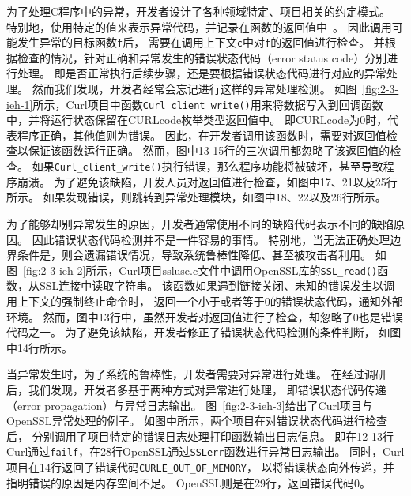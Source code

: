 

为了处理C程序中的异常，开发者设计了各种领域特定、项目相关的约定模式。
特别地，使用特定的值来表示异常代码，并记录在函数的返回值中~\cite{08-fast-eio}。
因此调用可能发生异常的目标函数\texttt{f}后，
需要在调用上下文\texttt{c}中对\texttt{f}的返回值进行检查。
并根据检查的情况，针对正确和异常发生的错误状态代码（error status code）分别进行处理。
即是否正常执行后续步骤，还是要根据错误状态代码进行对应的异常处理。
然而我们发现，开发者经常会忘记进行这样的异常处理检测。
如图~\ref{fig:2-3-ieh-1}所示，Curl项目中函数\texttt{Curl\_client\_write()}用来将数据写入到回调函数中，并将运行状态保留在CURLcode枚举类型返回值中。
即CURLcode为0时，代表程序正确，其他值则为错误。
因此，在开发者调用该函数时，需要对返回值检查以保证该函数运行正确。
然而，图中13-15行的三次调用都忽略了该返回值的检查。
如果\texttt{Curl\_client\_write()}执行错误，那么程序功能将被破坏，甚至导致程序崩溃。
为了避免该缺陷，开发人员对返回值进行检查，如图中17、21以及25行所示。
如果发现错误，则跳转到异常处理模块，如图中18、22以及26行所示。



为了能够却别异常发生的原因，开发者通常使用不同的缺陷代码表示不同的缺陷原因。
因此错误状态代码检测并不是一件容易的事情。
特别地，当无法正确处理边界条件是，则会遗漏错误情况，导致系统鲁棒性降低、甚至被攻击者利用。
如图~\ref{fig:2-3-ieh-2}所示，Curl项目ssluse.c文件中调用OpenSSL库的\texttt{SSL\_read()}函数，从SSL连接中读取字符串。
该函数如果遇到链接关闭、未知的错误发生以调用上下文的强制终止命令时，
返回一个小于或者等于0的错误状态代码，通知外部环境。
然而，图中13行中，虽然开发者对返回值进行了检查，却忽略了0也是错误代码之一。
为了避免该缺陷，开发者修正了错误状态代码检测的条件判断，
如图中14行所示。



当异常发生时，为了系统的鲁棒性，开发者需要对异常进行处理。
在经过调研后，我们发现，开发者多基于两种方式对异常进行处理，
即错误状态代码传递（error propagation）与异常日志输出。
图~\ref{fig:2-3-ieh-3}给出了Curl项目与OpenSSL异常处理的例子。
如图中所示，两个项目在对错误状态代码进行检查后，
分别调用了项目特定的错误日志处理打印函数输出日志信息。
即在12-13行Curl通过\texttt{failf}，在28行OpenSSL通过\texttt{SSLerr}函数进行异常日志输出。
同时，Curl项目在14行返回了错误代码\texttt{CURLE\_OUT\_OF\_MEMORY}，
以将错误状态向外传递，并指明错误的原因是内存空间不足。
OpenSSL则是在29行，返回错误代码0。

\vspace*{10pt}
\begin{center}
	\noindent{}
\end{center}

